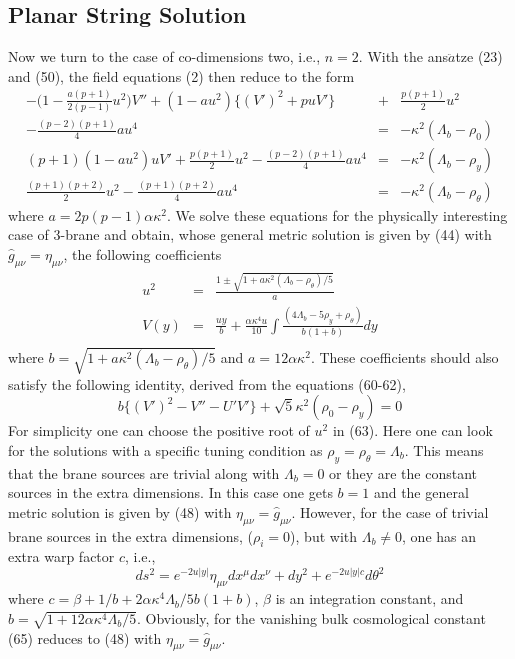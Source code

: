 \documentclass[a4paper,12pt]{article}
\newcommand {\nn} {\nonumber}
\begin{document}
\subsection{Planar String Solution}
Now we turn to the case of co-dimensions two, i.e., $n=2$. With the 
ans$\ddot{a}$tze (23) and (50), the field equations (2) then reduce to the form
\begin{eqnarray}
-\Big(1-\frac{a(p+1)}{2(p-1)}u^2\Big)V''+(1-au^2)\big\{(V')^2+puV'\big\}
&+&\frac{p(p+1)}{2}u^2\nn\\
-\frac{(p-2)(p+1)}{4}a u^4&=&-\kappa^2(\Lambda_b-\rho_0)\\
(p+1)(1-au^2)uV'+\frac{p(p+1)}{2}u^2-\frac{(p-2)(p+1)}{4}a u^4
&=&-\kappa^2(\Lambda_b-\rho_y)\\
\frac{(p+1)(p+2)}{2}u^2-\frac{(p+1)(p+2)}{4}a u^4
&=&-\kappa^2(\Lambda_b-\rho_{\theta})
\end{eqnarray}
where $a=2p(p-1)\alpha\kappa^2$. We solve these equations for the physically 
interesting case of $3$-brane and obtain, whose general metric solution is 
given by (44) with $\hat{g}_{\mu\nu}=\eta_{\mu\nu}$, the following 
coefficients
\begin{eqnarray}
u^2&=&\frac{1\pm\sqrt{1+a\kappa^2(\Lambda_b-\rho_{\theta})/5}}{a}\nn\\
V(y)&=&\frac{uy}{b}+\frac{\alpha\kappa^4u}{10}
\int\frac{(4\Lambda_b-5\rho_y+\rho_{\theta})}
{b(1+b)}dy\nn\\
\end{eqnarray}
where $b=\sqrt{1+a\kappa^2(\Lambda_b-\rho_{\theta})/5}$ and 
$a=12\alpha\kappa^2$. These coefficients should also satisfy the following 
identity, derived from the equations (60-62), 
\begin{equation}
b\big\{(V')^2-V''-U'V'\big\}+\sqrt{5}\kappa^2(\rho_0-\rho_y)=0
\end{equation}
For simplicity one can choose the positive root of $u^2$ in (63). 
Here one can look for the solutions with a specific tuning condition as 
$\rho_y=\rho_{\theta}=\Lambda_b$. This means that the brane sources are 
trivial along with $\Lambda_b=0$ or they are the constant sources 
in the extra dimensions. In this case one gets $b=1$ and the general metric 
solution is given by (48) with $\eta_{\mu\nu}=\hat{g}_{\mu\nu}$. 
However, for the case of trivial brane sources in the extra dimensions, 
($\rho_i=0$), but with $\Lambda_b\neq 0$, one has an extra warp factor 
$c$, i.e.,
\begin{equation}
ds^2= e^{-2u|y|}\eta_{\mu\nu}dx^\mu dx^\nu + dy^2 
+ e^{-2u|y|c} d\theta^2
\end{equation}
where $c=\beta+1/b+2\alpha\kappa^4\Lambda_b/{5b(1+b)}$, $\beta$ is an 
integration constant, and 
$b=\sqrt{1+12\alpha\kappa^4\Lambda_b/5}$. Obviously, for the vanishing bulk 
cosmological constant (65) reduces to (48) with 
$\eta_{\mu\nu}=\hat{g}_{\mu\nu}$.
\nopagebreak[12]
\end{document}

